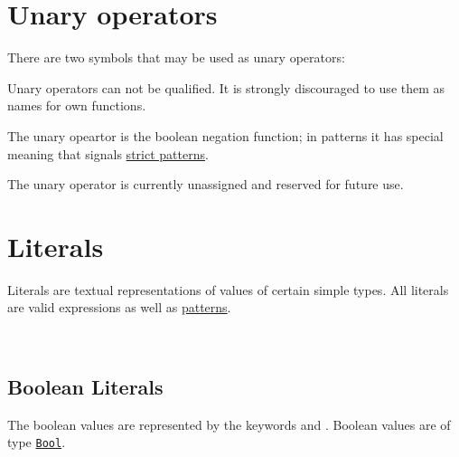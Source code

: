 \section{Unary operators}

There are two symbols that may be used as unary operators:

\begin{flushleft}
 \sym{!} \oder{} 
\end{flushleft}

Unary operators can not be qualified. It is strongly discouraged to use them as names for own functions.

The unary opeartor \sym{!} is the boolean negation function; in patterns it has special meaning that signals  \hyperref[strictpats]{strict patterns}.

The unary operator  is currently unassigned and reserved for future use. 

\section{Literals}

Literals are textual representations of values of certain simple types. All literals are valid expressions as well as \hyperref[patterns]{patterns}.

\begin{flushleft}
  \oder{}  \alt{}  \oder{}  \oder{} \\
  \oder{} 
\end{flushleft}


\subsection{Boolean Literals} \label{boolliteral}

The boolean values are represented by the keywords  and . 
Boolean values are of type \hyperref[boolean]{\texttt{Bool}}.

\begin{flushleft}
  \oder{} 
\end{flushleft}

